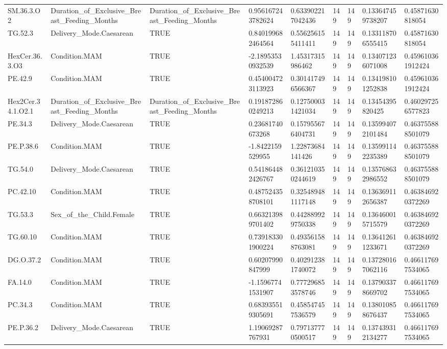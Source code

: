 \begin{longtable}{lllllllll}
SM.36.3.O2 & Duration\_of\_Exclusive\_Breast\_Feeding\_Months & Duration\_of\_Exclusive\_Breast\_Feeding\_Months & 0.956167243782624 & 0.633902217042436 & 149 & 149 & 0.133647459738207 & 0.45871630818054 \\
TG.52.3 & Delivery\_Mode.Caesarean & TRUE & 0.840199682464564 & 0.556256155411411 & 149 & 149 & 0.133118706555415 & 0.45871630818054 \\
HexCer.36.3.O3 & Condition.MAM & TRUE & -2.18953530932539 & 1.45317315986462 & 149 & 149 & 0.134071236071008 & 0.459610361912424 \\
PE.42.9 & Condition.MAM & TRUE & 0.454004723113923 & 0.301417496566367 & 149 & 149 & 0.134198101252838 & 0.459610361912424 \\
Hex2Cer.34.1.O2.1 & Duration\_of\_Exclusive\_Breast\_Feeding\_Months & Duration\_of\_Exclusive\_Breast\_Feeding\_Months & 0.191872860249213 & 0.127500031421034 & 149 & 149 & 0.13454395820425 & 0.460297256577823 \\
PE.34.3 & Delivery\_Mode.Caesarean & TRUE & 0.23681740673268 & 0.157955676404731 & 149 & 149 & 0.135994072101484 & 0.463755888501079 \\
PE.P.38.6 & Condition.MAM & TRUE & -1.8422159529955 & 1.22873684141426 & 149 & 149 & 0.135991142235389 & 0.463755888501079 \\
TG.54.0 & Delivery\_Mode.Caesarean & TRUE & 0.541864482426767 & 0.361210350244619 & 149 & 149 & 0.135768632986552 & 0.463755888501079 \\
PC.42.10 & Condition.MAM & TRUE & 0.487524358708101 & 0.325489481117148 & 149 & 149 & 0.136369112656387 & 0.463846920372269 \\
TG.53.3 & Sex\_of\_the\_Child.Female & TRUE & 0.663213989701402 & 0.442889929750338 & 149 & 149 & 0.136460015715579 & 0.463846920372269 \\
TG.60.10 & Condition.MAM & TRUE & 0.739183301900224 & 0.493561588763081 & 149 & 149 & 0.136412611233671 & 0.463846920372269 \\
DG.O.37.2 & Condition.MAM & TRUE & 0.60207990847999 & 0.402912381740072 & 149 & 149 & 0.137280167062116 & 0.466117697534065 \\
FA.14.0 & Condition.MAM & TRUE & -1.15967741531907 & 0.777296853578746 & 149 & 149 & 0.137903378669702 & 0.466117697534065 \\
PC.34.3 & Condition.MAM & TRUE & 0.683935519305691 & 0.458547457536579 & 149 & 149 & 0.138010858676437 & 0.466117697534065 \\
PE.P.36.2 & Delivery\_Mode.Caesarean & TRUE & 1.19069287767931 & 0.797137770500517 & 149 & 149 & 0.137439312134277 & 0.466117697534065 \\

\end{longtable}
